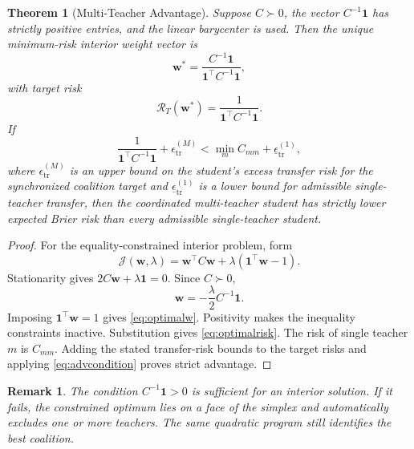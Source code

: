 \documentclass[10pt,twocolumn,a4paper]{article}
\newtheorem{theorem}{Theorem}
\newtheorem{remark}{Remark}
\newcommand{\cR}{\mathcal{R}}
\newcommand{\cJ}{\mathcal{J}}
\newcommand{\ind}{\mathbf{1}}
\begin{document}
\begin{theorem}[Multi-Teacher Advantage]
\label{thm:advantage}
Suppose \(C\succ0\), the vector \(C^{-1}\ind\) has strictly positive entries, and the linear barycenter is used. Then the unique minimum-risk interior weight vector is
\begin{equation}
 \bm w^*=\frac{C^{-1}\ind}{\ind^\top C^{-1}\ind},
\label{eq:optimalw}
\end{equation}
with target risk
\begin{equation}
 \cR_T(\bm w^*)=\frac{1}{\ind^\top C^{-1}\ind}.
\label{eq:optimalrisk}
\end{equation}
If
\begin{equation}
 \frac{1}{\ind^\top C^{-1}\ind}+\epsilon_{\mathrm{tr}}^{(M)}
 <\min_m C_{mm}+\underline\epsilon_{\mathrm{tr}}^{(1)},
\label{eq:advcondition}
\end{equation}
where \(\epsilon_{\mathrm{tr}}^{(M)}\) is an upper bound on the student's excess transfer risk for the synchronized coalition target and \(\underline\epsilon_{\mathrm{tr}}^{(1)}\) is a lower bound for admissible single-teacher transfer, then the coordinated multi-teacher student has strictly lower expected Brier risk than every admissible single-teacher student.
\end{theorem}

\begin{proof}
For the equality-constrained interior problem, form
\begin{equation}
 \cJ(\bm w,\lambda)=\bm w^\top C\bm w+\lambda(\ind^\top\bm w-1).
\end{equation}
Stationarity gives \(2C\bm w+\lambda\ind=0\). Since \(C\succ0\),
\begin{equation}
 \bm w=-\frac{\lambda}{2}C^{-1}\ind.
\end{equation}
Imposing \(\ind^\top\bm w=1\) gives \cref{eq:optimalw}. Positivity makes the inequality constraints inactive. Substitution gives \cref{eq:optimalrisk}. The risk of single teacher \(m\) is \(C_{mm}\). Adding the stated transfer-risk bounds to the target risks and applying \cref{eq:advcondition} proves strict advantage.
\end{proof}

\begin{remark}
The condition \(C^{-1}\ind>0\) is sufficient for an interior solution. If it fails, the constrained optimum lies on a face of the simplex and automatically excludes one or more teachers. The same quadratic program still identifies the best coalition.
\end{remark}
\end{document}
